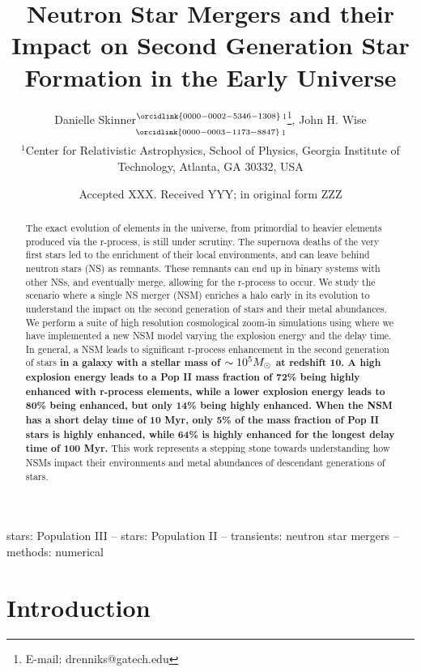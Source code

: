\documentclass[fleqn,usenatbib]{mnras}
\title[Neutron Star Mergers from Population III Stars]{Neutron Star Mergers and their Impact on Second Generation Star Formation in the Early Universe}
\author[Skinner \& Wise]{
Danielle Skinner$^{\orcidlink{0000-0002-5346-1308}}$$^{1}$\thanks{E-mail: drenniks@gatech.edu},
John H. Wise$^{\orcidlink{0000-0003-1173-8847}}$$^{1}$
\\
$^{1}$Center for Relativistic Astrophysics, School of Physics, Georgia Institute of Technology, Atlanta, GA 30332, USA\\
}
\date{Accepted XXX. Received YYY; in original form ZZZ}
\begin{document}
\label{firstpage}
\pagerange{\pageref{firstpage}--\pageref{lastpage}}
\maketitle

\begin{abstract}
	The exact evolution of elements in the universe, from primordial to heavier elements produced via the r-process, is still under scrutiny. The supernova deaths of the very first stars led to the enrichment of their local environments, and can leave behind neutron stars (NS) as remnants. These remnants can end up in binary systems with other NSs, and eventually merge, allowing for the r-process to occur. We study the scenario where a single NS merger (NSM) enriches a halo early in its evolution to understand the impact on the second generation of stars and their metal abundances. We perform a suite of high resolution cosmological zoom-in simulations using \enzo{} where we have implemented a new NSM model varying the explosion energy and the delay time. In general, a NSM leads to significant r-process enhancement in the second generation of stars \textbf{in a galaxy with a stellar mass of $\sim 10^5 \Ms$ at redshift 10.  A high explosion energy leads to a Pop II mass fraction of 72\% being highly enhanced with r-process elements, while a lower explosion energy leads to 80\% being enhanced, but only 14\% being highly enhanced. When the NSM has a short delay time of 10 Myr, only 5\% of the mass fraction of Pop II stars is highly enhanced, while 64\% is highly enhanced for the longest delay time of 100 Myr.} This work represents a stepping stone towards understanding how NSMs impact their environments and metal abundances of descendant generations of stars.
\end{abstract}

\begin{keywords}
stars: Population III -- stars: Population II -- transients: neutron star mergers -- methods: numerical
\end{keywords}



\section{Introduction}
\end{document}
